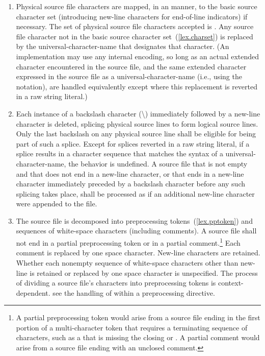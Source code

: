 \begin{enumerate}
%
%
%
\item Physical source file characters are mapped, in an
 manner,
to the basic source character set (introducing new-line characters for end-of-line
indicators) if necessary.
The set of physical source file characters accepted is .
Any
source file character not in the basic source character
set~(\ref{lex.charset}) is replaced by the
universal-character-name that
designates that character. (An implementation may use any internal
encoding, so long as an actual extended character encountered in the
source file, and the same extended character expressed in the source
file as a universal-character-name (i.e., using the  notation), are handled equivalently
except where this replacement is reverted in a raw string literal.)

%
\item Each instance of a backslash character (\textbackslash)
immediately followed by a new-line character is deleted, splicing
physical source lines to form logical source lines. Only the last
backslash on any physical source line shall be eligible for being part
of such a splice.
Except for splices reverted in a raw string literal, if a splice results in
a character sequence that matches the
syntax of a universal-character-name, the behavior is
undefined. A source file that is not empty and that does not end in a new-line
character, or that ends in a new-line character immediately preceded by a
backslash character before any such splicing takes place,
shall be processed as if an additional new-line character were appended
to the file.

\item The source file is decomposed into preprocessing
tokens~(\ref{lex.pptoken}) and sequences of white-space characters
(including comments). A source file shall not end in a partial
preprocessing token or in a partial comment.\footnote{A partial preprocessing
token would arise from a source file
ending in the first portion of a multi-character token that requires a
terminating sequence of characters, such as a 
that is missing the closing 
or \tcode{>}. A partial comment
would arise from a source file ending with an unclosed \tcode{/*}
comment.}
Each comment is replaced by one space character. New-line characters are
retained. Whether each nonempty sequence of white-space characters other
than new-line is retained or replaced by one space character is
unspecified. The process of dividing a source file's
characters into preprocessing tokens is context-dependent.
\enterexample
see the handling of \tcode{<} within a  preprocessing
directive.
\exitexample


\end{enumerate}
